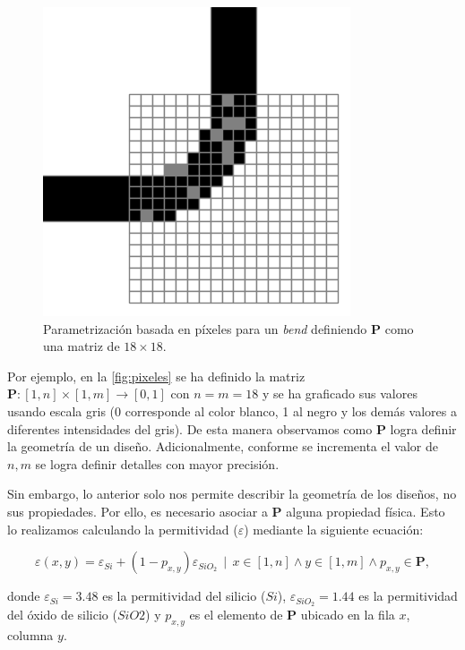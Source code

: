 \begin{figure}[h]
  \centering
  \includegraphics[scale=0.7]{image/theory/parametrization-pixeles.png}
  \caption{Parametrización basada en píxeles para un \emph{bend} definiendo $\boldsymbol{P}$ como una matriz de $18 \times 18$.}
  \label{fig:pixeles}
\end{figure}

Por ejemplo, en la \autoref{fig:pixeles} se ha definido la matriz $\boldsymbol{P}: [1, n] \times [1, m]
\to [0, 1]$ con $n = m = 18$ y se ha graficado sus valores
usando escala gris (0 corresponde al color blanco, 1 al negro y los demás valores a diferentes
intensidades del gris). De esta manera observamos como $\boldsymbol{P}$ logra definir la geometría de un
diseño.
Adicionalmente, conforme se incrementa el valor de $n, m$ se logra definir detalles con mayor precisión.


Sin embargo, lo anterior solo nos permite describir la geometría de los diseños, no sus propiedades.
Por ello, es necesario asociar a $\boldsymbol{P}$ alguna propiedad física.
Esto lo realizamos calculando la permitividad ($\varepsilon$) mediante la siguiente ecuación:

\begin{equation}
  \varepsilon(x, y) = \varepsilon_{Si} + (1 - p_{x,y})
  \varepsilon_{SiO_2} \, \mid \, x \in [1, n] \land y \in [1, m] \land p_{x,y} \in
  \boldsymbol{P},
\label{eq:permitivity}
\end{equation}

donde $\varepsilon_{Si} = 3.48$ es la permitividad del silicio ($Si$),
$\varepsilon_{SiO_2} = 1.44$ es la permitividad del óxido de silicio ($SiO2$) y $p_{x, y}$
es el elemento de $\boldsymbol{P}$ ubicado en la fila $x$, columna $y$.

